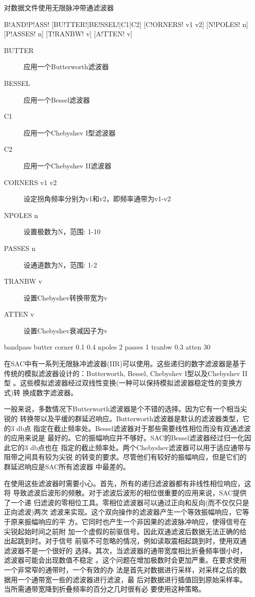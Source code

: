 \label{cmd:bandpass}

对数据文件使用无限脉冲带通滤波器

\begin{SACSTX}
B!AND!P!ASS! [BU!TTER!|BE!SSEL!|C1|C2] [C!ORNERS! v1 v2] [N!POLES! n] [P!ASSES! n] 
    [T!RANBW! v] [A!TTEN! v]
\end{SACSTX}

\begin{description}
\item [BUTTER] 应用一个Butterworth滤波器
\item [BESSEL] 应用一个Bessel滤波器
\item [C1] 应用一个Chebyshev I型滤波器
\item [C2] 应用一个Chebyshev II滤波器
\item [CORNERS v1 v2] 设定拐角频率分别为v1和v2，即频率通带为v1-v2
\item [NPOLES n] 设置极数为N，范围: 1-10
\item [PASSES n] 设通道数为N，范围: 1-2
\item [TRANBW v] 设置Chebyshev转换带宽为v
\item [ATTEN v] 设置Chebyshev衰减因子为v
\end{description}

\begin{SACDFT}
bandpass butter corner 0.1 0.4 npoles 2 passes 1 tranbw 0.3 atten 30
\end{SACDFT}

在SAC中有一系列无限脉冲滤波器(IIR)可以使用。这些递归的数字滤波器是基于
传统的模拟滤波器设计的：Butterworth, Bessel, Chebyshev I型以及Chebyshev II型
。这些模拟滤波器经过双线性变换(一种可以保持模拟滤波器稳定性的变换方式)转
换成数字滤波器。

一般来说，多数情况下Butterworth滤波器是个不错的选择。因为它有一个相当尖锐的
转换带以及平缓的群延迟响应。Butterworth滤波器是默认的滤波器类型，它的3 db点
指定在截止频率处。Bessel滤波器对于那些需要线性相位而没有双通滤波的应用来说是
最好的。它的振幅响应并不够好。SAC的Bessel滤波器经过归一化因此它的3 db点也在
指定的截止频率处。两个Chebyshev滤波器可以用于适应通带与阻带之间具有较为尖锐
的转变的要求。尽管他们有较好的振幅响应，但是它们的群延迟响应是SAC所有滤波器
中最差的。

在使用这些滤波器时需要小心。首先，所有的递归滤波器都有非线性相位响应，这将
导致滤波后波形的频散。对于滤波后波形的相位很重要的应用来说，SAC提供了一个递
归滤波的零相位工具。零相位滤波器可以通过正向和反向(而不仅仅只是正向滤波)两次
滤波来实现。这个双向操作的滤波器产生一个等效振幅响应，它等于原来振幅响应的平
方。它同时也产生一个非因果的滤波脉冲响应，使得信号在尖锐起始时间之前附
加一个虚假的前驱信号。因此双通滤波后数据无法正确的给出起跳到时。对于信号
前驱不可忽略的情况，例如读取震相起跳到时，使用双通滤波器不是一个很好的
选择。其次，当滤波器的通带宽度相比折叠频率很小时，滤波器可能会出现数值不稳定
。这个问题在增加极数时会更加严重。在要求使用一个非常窄的通带时，一个有效的办
法是首先对数据进行采样，对采样之后的数据用一个通带宽一些的滤波器进行滤波，最
后对数据进行插值回到原始采样率。当所需通带宽降到折叠频率的百分之几时很有必	
要使用这种策略。


